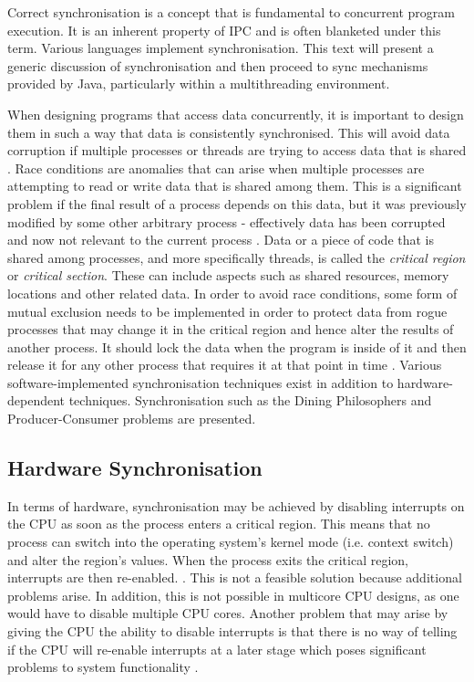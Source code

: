 \documentclass[12pt,a4paper,oneside]{article}
\begin{document}
\begin{spacing}{1.4}
Correct synchronisation is a concept that is fundamental to concurrent program execution. It is an inherent property of IPC and is often blanketed under this term. Various languages implement synchronisation. This text will present a generic discussion of synchronisation and then proceed to sync mechanisms provided by Java, particularly within a multithreading environment.

When designing programs that access data concurrently, it is important to design them in such a way that data is consistently synchronised. This will avoid data corruption if multiple processes or threads are trying to access data that is shared \citep{garg2005concurrent}. Race conditions are anomalies that can arise when multiple processes are attempting to read or write data that is shared among them. This is a significant problem if the final result of a process depends on this data, but it was previously modified by some other arbitrary process - effectively data has been corrupted and now not relevant to the current process \citep{modernOS}. Data or a piece of code that is shared among processes, and more specifically threads, is called the \textit{critical region} or \textit{critical section}. These can include aspects such as shared resources, memory locations and other related data. In order to avoid race conditions, some form of mutual exclusion needs to be implemented in order to protect data from rogue processes that may change it in the critical region and hence alter the results of another process. It should lock the data when the program is inside of it and then release it for any other process that requires it at that point in time \citep{multithreadingwin32}. Various software-implemented synchronisation techniques exist in addition to hardware-dependent techniques. Synchronisation such as the Dining Philosophers and Producer-Consumer problems are presented. 

\subsection{Hardware Synchronisation}
In terms of hardware, synchronisation may be achieved by disabling interrupts on the CPU as soon as the process enters a critical region. This means that no process can switch into the operating system's kernel mode (i.e. context switch) and alter the region's values. When the process exits the critical region, interrupts are then re-enabled. \citep{garg2005concurrent}. This is not a feasible solution because additional problems arise. In addition, this is not possible in multicore CPU designs, as one would have to disable multiple CPU cores. Another problem that may arise by giving the CPU the ability to disable interrupts is that there is no way of telling if the CPU will re-enable interrupts at a later stage which poses significant problems to system functionality \citep{modernOS}.


\end{spacing}
\end{document}
